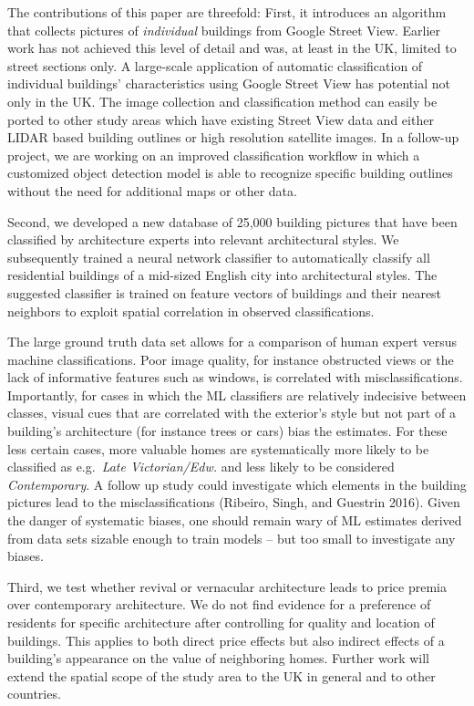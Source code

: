\documentclass[]{article}
\begin{document}
The contributions of this paper are threefold: First, it introduces an
algorithm that collects pictures of \emph{individual} buildings from
Google Street View. Earlier work has not achieved this level of detail
and was, at least in the UK, limited to street sections only. A
large-scale application of automatic classification of individual
buildings' characteristics using Google Street View has potential not
only in the UK. The image collection and classification method can
easily be ported to other study areas which have existing Street View
data and either LIDAR based building outlines or high resolution
satellite images. In a follow-up project, we are working on an improved
classification workflow in which a customized object detection model is
able to recognize specific building outlines without the need for
additional maps or other data.

Second, we developed a new database of 25,000 building pictures that
have been classified by architecture experts into relevant architectural
styles. We subsequently trained a neural network classifier to
automatically classify all residential buildings of a mid-sized English
city into architectural styles. The suggested classifier is trained on
feature vectors of buildings and their nearest neighbors to exploit
spatial correlation in observed classifications.

The large ground truth data set allows for a comparison of human expert
versus machine classifications. Poor image quality, for instance
obstructed views or the lack of informative features such as windows, is
correlated with misclassifications. Importantly, for cases in which the
ML classifiers are relatively indecisive between classes, visual cues
that are correlated with the exterior's style but not part of a
building's architecture (for instance trees or cars) bias the estimates.
For these less certain cases, more valuable homes are systematically
more likely to be classified as e.g.~\emph{Late Victorian/Edw.} and less
likely to be considered \emph{Contemporary}. A follow up study could
investigate which elements in the building pictures lead to the
misclassifications (Ribeiro, Singh, and Guestrin 2016). Given the danger
of systematic biases, one should remain wary of ML estimates derived
from data sets sizable enough to train models -- but too small to
investigate any biases.

Third, we test whether revival or vernacular architecture leads to price
premia over contemporary architecture. We do not find evidence for a
preference of residents for specific architecture after controlling for
quality and location of buildings. This applies to both direct price
effects but also indirect effects of a building's appearance on the
value of neighboring homes. Further work will extend the spatial scope
of the study area to the UK in general and to other countries.
\end{document}
